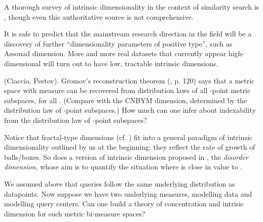 \documentclass[12pt]{article}
\begin{document}
\smallskip
{} 
A thorough survey of intrinsic dimensionality in the context of similarity search is \cite{clarkson}, though even this authoritative source is not comprehensive. 

\noindent
 It is safe to predict that the mainstream research direction in the field will be a discovery of further ``dimensionality parameters of positive type'', such as Assouad dimension. More and more real datasets that currently appear high-dimensional will turn out to have low, tractable intrinsic dimensions.

\noindent

(Ciaccia, Pestov). Gromov's reconstruction theorem (\cite{gromov:99}, p. 120) says that a metric space with measure can be recovered from distribution laws of all -point metric subspaces, for all . (Compare with the CNBYM dimension, determined by the distribution law of -point subspaces.) How much can one infer about indexability from the distribution law of -point subspaces?

\noindent
 Notice that fractal-type dimensions (cf. \cite{ttf}) fit into a general paradigm of intrinsic dimensionality outlined by us at the beginning: they reflect the rate of growth of balls/boxes. So does a version of intrinsic dimension  proposed in \cite{lifshits}, the {\em disorder dimension,} whose aim is to quantify the situation where  is close in value to .

\noindent

We assumed above that queries follow the same underlying distribution as datapoints. Now suppose we have two underlying measures,  modelling data and  modelling query centers. Can one build a theory of concentration and intrisic dimension for such metric bi-measure spaces?
\end{document}
